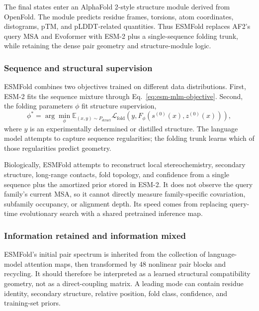 \documentclass[10pt]{article}
\newcommand{\E}{\mathbb E}
\begin{document}
The final states enter an AlphaFold 2-style structure module derived from OpenFold.  The module
predicts residue frames, torsions, atom coordinates, distograms, pTM, and pLDDT-related quantities.
Thus ESMFold replaces AF2's query MSA and Evoformer with ESM-2 plus a single-sequence folding trunk,
while retaining the dense pair geometry and structure-module logic.

\subsubsection{Sequence and structural supervision}

ESMFold combines two objectives trained on different data distributions.  First, ESM-2 fits the
sequence mixture through Eq.~\ref{eq:esm-mlm-objective}.  Second, the folding parameters $\phi$ fit
structure supervision,
\begin{equation}
\phi^*
=\arg\min_{\phi}
\E_{(x,y)\sim P_{\mathrm{struct}}}
\mathcal L_{\mathrm{fold}}
\left(
y,
F_{\phi}(s^{(0)}(x),z^{(0)}(x))
\right),
\label{eq:esmfold-structure-objective}
\end{equation}
where $y$ is an experimentally determined or distilled structure.  The language model attempts to
capture sequence regularities; the folding trunk learns which of those regularities predict
geometry.

Biologically, ESMFold attempts to reconstruct local stereochemistry, secondary structure,
long-range contacts, fold topology, and confidence from a single sequence plus the amortized prior
stored in ESM-2.  It does not observe the query family's current MSA, so it cannot directly measure
family-specific covariation, subfamily occupancy, or alignment depth.  Its speed comes from
replacing query-time evolutionary search with a shared pretrained inference map.

\subsubsection{Information retained and information mixed}

ESMFold's initial pair spectrum is inherited from the collection of language-model attention maps,
then transformed by 48 nonlinear pair blocks and recycling.  It should therefore be interpreted as
a learned structural compatibility geometry, not as a direct-coupling matrix.  A leading mode can
contain residue identity, secondary structure, relative position, fold class, confidence, and
training-set priors.
\end{document}
